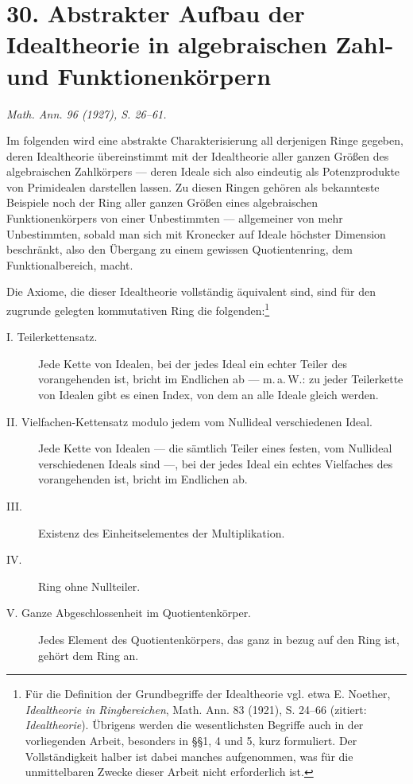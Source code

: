 \documentclass[11pt]{article}
\begin{document}
\section*{30. Abstrakter Aufbau der Idealtheorie in algebraischen Zahl- und Funktionenkörpern}
\noindent\emph{Math. Ann. 96 (1927), S. 26--61.}

Im folgenden wird eine abstrakte Charakterisierung all derjenigen Ringe gegeben,
deren Idealtheorie übereinstimmt mit der Idealtheorie aller ganzen Größen des
algebraischen Zahlkörpers — deren Ideale sich also eindeutig als Potenzprodukte
von Primidealen darstellen lassen. Zu diesen Ringen gehören als bekannteste
Beispiele noch der Ring aller ganzen Größen eines algebraischen Funktionenkörpers
von einer Unbestimmten — allgemeiner von mehr Unbestimmten, sobald man sich
mit Kronecker auf Ideale höchster Dimension beschränkt, also den Übergang zu
einem gewissen Quotientenring, dem Funktionalbereich, macht.

Die Axiome, die dieser Idealtheorie vollständig äquivalent sind, sind für den
zugrunde gelegten kommutativen Ring die folgenden:\footnote{Für die Definition
der Grundbegriffe der Idealtheorie vgl. etwa E. Noether, \emph{Idealtheorie in
Ringbereichen}, Math. Ann. 83 (1921), S. 24--66 (zitiert: \emph{Idealtheorie}).
Übrigens werden die wesentlichsten Begriffe auch in der vorliegenden Arbeit,
besonders in §§1, 4 und 5, kurz formuliert. Der Vollständigkeit halber ist dabei
manches aufgenommen, was für die unmittelbaren Zwecke dieser Arbeit nicht
erforderlich ist.}

\begin{description}
\item[I. Teilerkettensatz.] Jede Kette von Idealen, bei der jedes Ideal ein
echter Teiler des vorangehenden ist, bricht im Endlichen ab — m.\,a.\,W.:
zu jeder Teilerkette von Idealen gibt es einen Index, von dem an alle Ideale
gleich werden.
\item[II. Vielfachen-Kettensatz modulo jedem vom Nullideal verschiedenen Ideal.]
Jede Kette von Idealen — die sämtlich Teiler eines festen, vom Nullideal
verschiedenen Ideals sind —, bei der jedes Ideal ein echtes Vielfaches des
vorangehenden ist, bricht im Endlichen ab.
\item[III.] Existenz des Einheitselementes der Multiplikation.
\item[IV.] Ring ohne Nullteiler.
\item[V. Ganze Abgeschlossenheit im Quotientenkörper.] Jedes Element des
Quotientenkörpers, das ganz in bezug auf den Ring ist, gehört dem Ring an.
\end{description}
\end{document}
